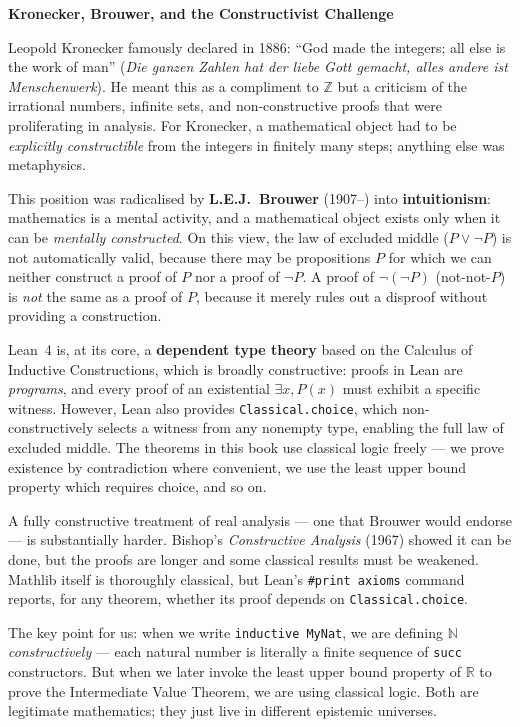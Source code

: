 \documentclass[12pt, openany]{book}
\theoremstyle{plain}
\theoremstyle{definition}
\theoremstyle{remark}
\newcommand{\N}{\mathbb{N}}
\newcommand{\Z}{\mathbb{Z}}
\newcommand{\R}{\mathbb{R}}
\begin{document}
\begin{remarkbox}
\textbf{Kronecker, Brouwer, and the Constructivist Challenge}

Leopold Kronecker famously declared in 1886: ``God made the integers; all else is the work of man'' (\emph{Die ganzen Zahlen hat der liebe Gott gemacht, alles andere ist Menschenwerk}). He meant this as a compliment to $\Z$ but a criticism of the irrational numbers, infinite sets, and non-constructive proofs that were proliferating in analysis. For Kronecker, a mathematical object had to be \emph{explicitly constructible} from the integers in finitely many steps; anything else was metaphysics.

This position was radicalised by \textbf{L.E.J.\ Brouwer} (1907--) into \textbf{intuitionism}: mathematics is a mental activity, and a mathematical object exists only when it can be \emph{mentally constructed}. On this view, the law of excluded middle ($P \lor \lnot P$) is not automatically valid, because there may be propositions $P$ for which we can neither construct a proof of $P$ nor a proof of $\lnot P$. A proof of $\lnot(\lnot P)$ (not-not-$P$) is \emph{not} the same as a proof of $P$, because it merely rules out a disproof without providing a construction.

Lean~4 is, at its core, a \textbf{dependent type theory} based on the Calculus of Inductive Constructions, which is broadly constructive: proofs in Lean are \emph{programs}, and every proof of an existential $\exists x, P(x)$ must exhibit a specific witness. However, Lean also provides \texttt{Classical.choice}, which non-constructively selects a witness from any nonempty type, enabling the full law of excluded middle. The theorems in this book use classical logic freely --- we prove existence by contradiction where convenient, we use the least upper bound property which requires choice, and so on.

A fully constructive treatment of real analysis --- one that Brouwer would endorse --- is substantially harder. Bishop's \emph{Constructive Analysis} (1967) showed it can be done, but the proofs are longer and some classical results must be weakened. Mathlib itself is thoroughly classical, but Lean's \texttt{\#print axioms} command reports, for any theorem, whether its proof depends on \texttt{Classical.choice}.

The key point for us: when we write \texttt{inductive MyNat}, we are defining $\N$ \emph{constructively} --- each natural number is literally a finite sequence of \texttt{succ} constructors. But when we later invoke the least upper bound property of $\R$ to prove the Intermediate Value Theorem, we are using classical logic. Both are legitimate mathematics; they just live in different epistemic universes.
\end{remarkbox}
\color{black}
\end{document}
